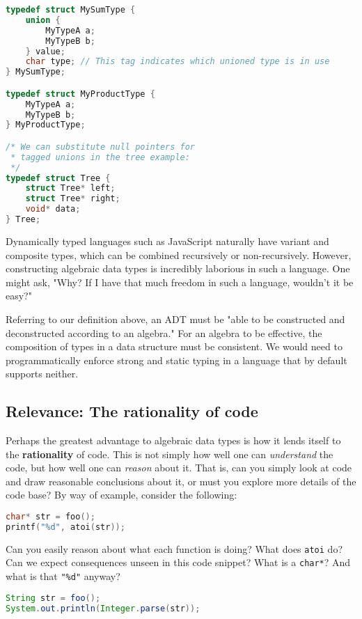 \documentclass[12pt,a4paper]{article}
\begin{document}
		\begin{lstlisting}[language=C]
typedef struct MySumType {
	union {
		MyTypeA a;
		MyTypeB b;
	} value;
	char type; // This tag indicates which unioned type is in use
} MySumType;

typedef struct MyProductType {
	MyTypeA a;
	MyTypeB b;
} MyProductType;

/* We can substitute null pointers for
 * tagged unions in the tree example:
 */
typedef struct Tree {
	struct Tree* left;
	struct Tree* right;
	void* data;
} Tree;
		\end{lstlisting}
		
		Dynamically typed languages such as JavaScript naturally have variant and composite types, which can be combined recursively or non-recursively. However, constructing algebraic data types is incredibly laborious in such a language. One might ask, "Why? If I have that much freedom in such a language, wouldn't it be easy?"
		
		Referring to our definition above, an ADT must be "able to be constructed and deconstructed according to an algebra." For an algebra to be effective, the composition of types in a data structure must be consistent. We would need to programmatically enforce strong and static typing in a language that by default supports neither.
		
		\subsection{Relevance: The rationality of code}
		
		Perhaps the greatest advantage to algebraic data types is how it lends itself to the \textbf{rationality} of code. This is not simply how well one can \textit{understand} the code, but how well one can \textit{reason} about it. That is, can you simply look at code and draw reasonable conclusions about it, or must you explore more details of the code base? By way of example, consider the following:
		
		\begin{lstlisting}[language=C]
char* str = foo();
printf("%d", atoi(str));
		\end{lstlisting}
		
		Can you easily reason about what each function is doing? What does \texttt{atoi} do? Can we expect consequences unseen in this code snippet? What is a \texttt{char*}? And what is that \texttt{"\%d"} anyway? 
		
		\begin{lstlisting}[language=Java]
String str = foo();
System.out.println(Integer.parse(str));
		\end{lstlisting}
		
\end{document}
